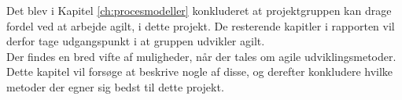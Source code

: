 Det blev i Kapitel \ref{ch:procesmodeller} konkluderet at projektgruppen kan drage fordel ved at
arbejde agilt, i dette projekt. De resterende kapitler i rapporten vil derfor tage udgangspunkt i at gruppen
udvikler agilt. \\ 

Der findes en bred vifte af muligheder, når der tales om agile udviklingsmetoder. Dette kapitel vil forsøge 
at beskrive nogle af disse, og derefter konkludere hvilke metoder der egner sig bedst til dette projekt.